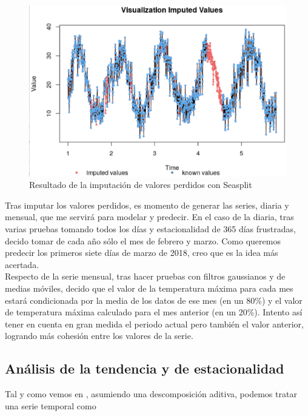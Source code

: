 \begin{figure}[H] %
	\centering
	\includegraphics[scale=0.24]{seasplit-na.png}  %
	\caption{Resultado de la imputación de valores perdidos con Seasplit} 
	\label{fig:seasplit}
\end{figure}

Tras imputar los valores perdidos, es momento de generar las series, diaria y mensual, que me servirá para modelar y predecir. En el caso de la diaria, tras varias pruebas tomando todos los días y estacionalidad de 365 días frustradas, decido tomar de cada año sólo el mes de febrero y marzo. Como queremos predecir los primeros siete días de marzo de 2018, creo que es la idea más acertada. \\

Respecto de la serie mensual, tras hacer pruebas con filtros gaussianos y de medias móviles, decido que el valor de la temperatura máxima para cada mes estará condicionada por la media de los datos de ese mes (en un 80\%) y el valor de temperatura máxima calculado para el mes anterior (en un 20\%). Intento así tener en cuenta en gran medida el periodo actual pero también el valor anterior, logrando más cohesión entre los valores de la serie. 

\subsection{Análisis de la tendencia y de estacionalidad}

Tal y como vemos en \cite{hyndman}, asumiendo una descomposición aditiva,  podemos tratar una serie temporal como

